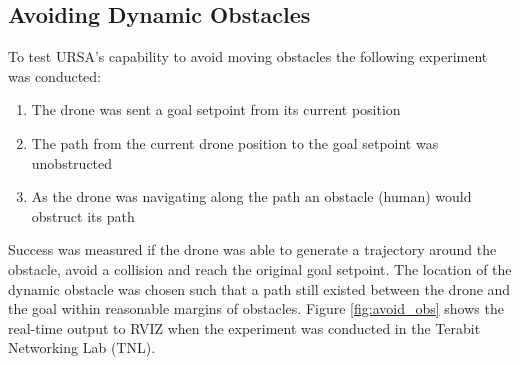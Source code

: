 \documentclass[capstone_report.tex]{subfiles}
\begin{document}
\subsection{Avoiding Dynamic Obstacles}
To test URSA's capability to avoid moving obstacles the following experiment was conducted:
\begin{enumerate}
    \item The drone was sent a goal setpoint from its current position
    \item The path from the current drone position to the goal setpoint was unobstructed
    \item As the drone was navigating along the path an obstacle (human) would obstruct its path
\end{enumerate}
Success was measured if the drone was able to generate a trajectory around the obstacle, avoid a collision and reach the original goal setpoint.  The location of the dynamic obstacle was chosen such that a path still existed between the drone and the goal within reasonable margins of obstacles.  Figure \ref{fig:avoid_obs} shows the real-time output to RVIZ when the experiment was conducted in the Terabit Networking Lab (TNL).
\end{document}
